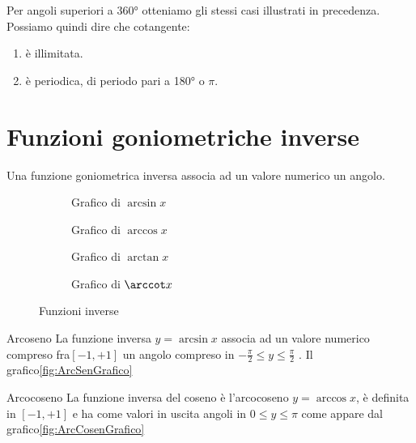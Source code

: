 Per angoli superiori a \ang{360} otteniamo gli stessi casi illustrati in precedenza. 
Possiamo quindi dire che cotangente:
\begin{enumerate}
	\item è illimitata.
	\item è periodica, di periodo pari a \ang{180} o $\pi$.
\end{enumerate} 
\begin{figure}
	\centering
	
	\label{fig:AndamentoCotangente2}
\end{figure}%
\section{Funzioni goniometriche inverse}
Una funzione goniometrica inversa associa ad un valore numerico un angolo.
\begin{figure}
	\begin{subfigure}[b]{.5\linewidth}
		\centering
	
		\caption{Grafico di $\arcsin x$}\label{fig:ArcSenGrafico}
	\end{subfigure}%
	\begin{subfigure}[b]{.5\linewidth}
		\centering
	
		\caption{Grafico di $\arccos x$}\label{fig:ArcCosenGrafico}
	\end{subfigure}
		\begin{subfigure}[b]{\linewidth}
			\centering
	
		\caption{Grafico di $\arctan x$}\label{fig:ArcTangenteGrafico}
		\end{subfigure}
		\begin{subfigure}[b]{\linewidth}
		\centering
		
		\caption{Grafico di $\arccot x$}\label{fig:ArcCotangenteGrafico}
	\end{subfigure}
			\caption{Funzioni inverse}\label{tab:funzinverse_1}
\end{figure}
\begin{definizionet}{Arcoseno}{}
	La funzione inversa $y=\arcsin x$ associa ad un valore numerico compreso fra$[-1,+1]$ un angolo compreso in $-\frac{\pi}{2}\leq y\leq\frac{\pi}{2}$ . Il grafico\nobs\vref{fig:ArcSenGrafico} 
\end{definizionet}
\begin{definizionet}{Arcocoseno}{}
	La funzione inversa del coseno è l'arcocoseno $y=\arccos x$, è definita in $[-1,+1]$ e ha come valori in uscita angoli in $0\leq y\leq\pi$ come appare dal grafico\nobs\vref{fig:ArcCosenGrafico} 
\end{definizionet}
